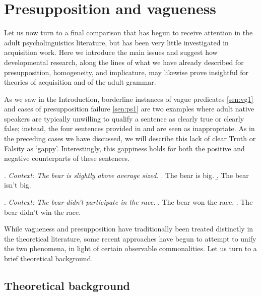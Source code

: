 \documentclass[12pt, letterpaper]{article}
\begin{document}
{%
\section{Presupposition and vagueness}

Let us now turn to a final comparison that has begun to receive attention in the adult psycholinguistics literature, but has been very little investigated in acquisition work. Here we introduce the main issues and suggest how developmental research, along the lines of what we have already described for presupposition, homogeneity, and implicature, may likewise prove insightful for theories of acquisition and of the adult grammar.

As we saw in the Introduction, borderline instances of vague predicates \ref{sen:vg1} and cases of presupposition failure \ref{sen:ps1} are two examples where adult native speakers are typically unwilling to qualify a sentence as clearly true or clearly false; instead, the four sentences provided in \Next and \NNext are seen as inappropriate. As in the preceding cases we have discussed, we will describe this lack of clear Truth or Falsity as `gappy'. Interestingly, this gappiness holds for both the positive and negative counterparts of these sentences.

\ex.	\label{sen:vg1}	\textit{Context: The bear is slightly above average sized.}
\a.	\label{sen:vg1pos}The bear is big. %
\b.	\label{sen:vg1neg}The bear isn't big. %

\ex.	\label{sen:ps1}	\textit{Context: The bear didn't participate in the race.}
\a.	\label{sen:ps1pos}The bear won the race. %
\b.	\label{sen:ps1neg}The bear didn't win the race. %

While vagueness and presupposition have traditionally been treated distinctly in the theoretical literature, some recent approaches have begun to attempt to unify the two phenomena, in light of certain observable commonalities. Let us turn to a brief theoretical background. 

\subsection{Theoretical background}

}
\end{document}
